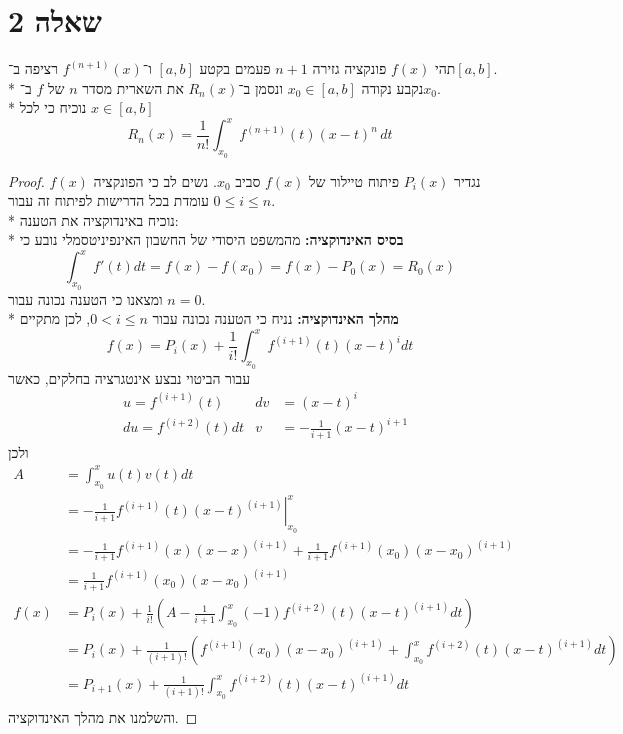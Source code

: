 \section{שאלה 2}
תהי $f(x)$ פונקציה גזירה $n + 1$ פעמים בקטע $[a, b]$ ו־$f^{(n + 1)}(x)$ רציפה ב־$[a, b]$. \\*
נקבע נקודה $x_0 \in [a, b]$ ונסמן ב־$R_n(x)$ את השארית מסדר $n$ של $f$ ב־$x_0$. \\*
נוכיח כי לכל $x \in [a, b]$
\[
	R_n(x) = \frac{1}{n!} \int_{x_0}^x f^{(n + 1)}(t){(x - t)}^n \, dt
\]
\begin{proof}
	נגדיר $P_i(x)$ פיתוח טיילור של $f(x)$ סביב $x_0$. נשים לב כי הפונקציה $f(x)$ עומדת בכל הדרישות לפיתוח זה עבור $0 \le i \le n$. \\*
	 נוכיח באינדוקציה את הטענה: \\*
	 \textbf{בסיס האינדוקציה:}
	 מהמשפט היסודי של החשבון האינפיניטסמלי נובע כי
	 \[
		 \int_{x_0}^x f'(t) dt = f(x) - f(x_0) = f(x) - P_0(x) = R_0(x)
	 \]
	 ומצאנו כי הטענה נכונה עבור $n = 0$. \\*
	 \textbf{מהלך האינדוקציה:}
	 נניח כי הטענה נכונה עבור $0 < i \le n$, לכן מתקיים
	 \[
		  f(x) = P_i(x) + \frac{1}{i!} \int_{x_0}^x f^{(i + 1)}(t) {(x - t)}^i dt
	 \]
	 עבור הביטוי נבצע אינטגרציה בחלקים, כאשר
	 \begin{align*}
		 & u = f^{(i + 1)}(t) & dv & = {(x - t)}^i \\
		 & du = f^{(i + 2)}(t) dt & v & = -\frac{1}{i + 1} {(x - t)}^{i + 1}
	 \end{align*}
	ולכן
	 \begin{align*}
		 A & = \int_{x_0}^x u(t) v(t) dt \\
		   & = \left. -\frac{1}{i + 1} f^{(i + 1)}(t){(x - t)}^{(i + 1)} \right|_{x_0}^x \\
		   & = -\frac{1}{i + 1} f^{(i + 1)}(x){(x - x)}^{(i + 1)} + \frac{1}{i + 1} f^{(i + 1)}(x_0){(x - x_0)}^{(i + 1)} \\
		   & = \frac{1}{i + 1} f^{(i + 1)}(x_0){(x - x_0)}^{(i + 1)} \\
		 f(x) & = P_i(x) + \frac{1}{i!} \left( A - \frac{1}{i + 1} \int_{x_0}^x (-1) f^{(i + 2)}(t) {(x - t)}^{(i + 1)} dt \right) \\
		 & = P_i(x) + \frac{1}{(i + 1)!} \left( f^{(i + 1)}(x_0){(x - x_0)}^{(i + 1)} + \int_{x_0}^x f^{(i + 2)}(t) {(x - t)}^{(i + 1)} dt \right) \\
		 & = P_{i + 1}(x) + \frac{1}{(i + 1)!} \int_{x_0}^x f^{(i + 2)}(t) {(x - t)}^{(i + 1)} dt \\
	 \end{align*}
	 והשלמנו את מהלך האינדוקציה.
\end{proof}

